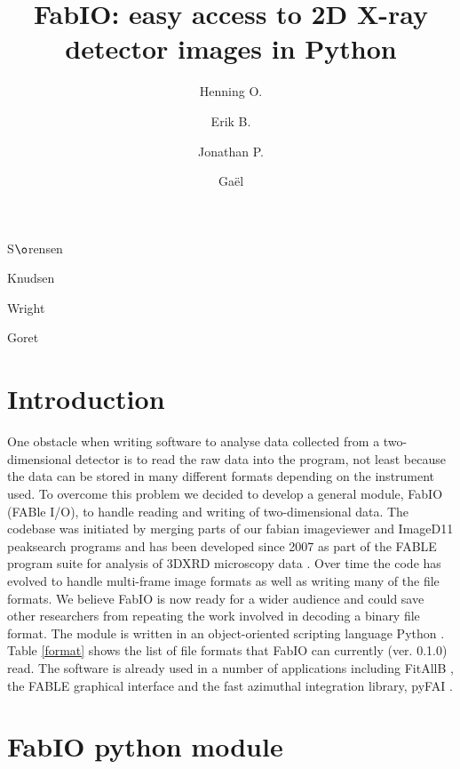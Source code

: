 \documentclass{iucr}
\begin{document}
\title{FabIO: easy access to 2D X-ray detector images in Python}

    \author[a]{Henning O.}{S$\o$rensen}
    \author[b]{Erik B.}{Knudsen}
    \author[c]{Jonathan P.}{Wright}
	\author[c]{Ga\"el}{Goret}

\maketitle

\section{Introduction}

One obstacle when writing software to analyse data collected from a
two-dimensional detector is to read the raw data into the program,
not least because the data can be stored in many different formats
depending on the instrument used.
To overcome this problem we decided to develop a general module,
FabIO (FABle I/O), to handle reading and writing of two-dimensional
data.
The codebase was initiated by merging parts of our fabian imageviewer
\cite{fabian} and ImageD11 \cite{ImageD11} peaksearch programs and has
been developed since 2007 as part of the FABLE \cite{fable} program suite
for analysis of 3DXRD microscopy data \cite{3dxrd}.
Over time the code has evolved to handle multi-frame image formats
as well as writing many of the file formats.
We believe FabIO is now ready for a wider audience and could save other
researchers from repeating the work involved in decoding a
binary file format.
The module is written in an object-oriented scripting language Python
\cite{python}.
Table \ref{format} shows the list of file formats that FabIO
can currently (ver. 0.1.0) read.
The software is already used in a number of applications including
FitAllB \cite{fitallb}, the FABLE graphical interface \cite{fable}
and the fast azimuthal integration library, pyFAI \cite{pyfai}.


\section{FabIO python module}
\end{document}
